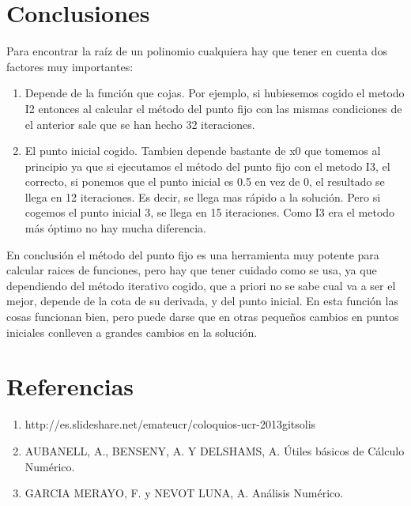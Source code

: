 \documentclass[a4paper]{article}
\begin{document}
\section{Conclusiones}
Para encontrar la raíz de un polinomio cualquiera hay que tener en cuenta dos factores muy importantes:
\begin{enumerate}
\item Depende de la función que cojas. Por ejemplo, si hubiesemos cogido el metodo I2 entonces al calcular el método del punto fijo con las mismas condiciones de el anterior sale que se han hecho 32 iteraciones.
\item El punto inicial cogido. Tambien depende bastante de x0 que tomemos al principio ya que si ejecutamos el método del punto fijo con el metodo I3, el correcto, si ponemos que el punto inicial es 0.5 en vez de 0, el resultado se llega en 12 iteraciones. Es decir, se llega mas rápido a la solución. Pero si cogemos el punto inicial 3, se llega en 15 iteraciones. Como I3 era el metodo más óptimo no hay mucha diferencia.
\end{enumerate}
En conclusión el método del punto fijo es una herramienta muy potente para calcular raices de funciones, pero hay que tener cuidado como se usa, ya que dependiendo del método iterativo cogido, que a priori no se sabe cual va a ser el mejor, depende de la cota de su derivada, y del punto inicial. En esta función las cosas funcionan bien, pero puede darse que en otras pequeños cambios en puntos iniciales conlleven a grandes cambios en la solución.

\section{Referencias}
\begin{enumerate}
\item{http://es.slideshare.net/emateucr/coloquios-ucr-2013gitsolis}
\item{AUBANELL, A., BENSENY, A. Y DELSHAMS, A.  Útiles básicos de Cálculo Numérico.}
\item{GARCIA MERAYO, F. y NEVOT LUNA, A.  Análisis Numérico.}
\end{enumerate}
\end{document}
